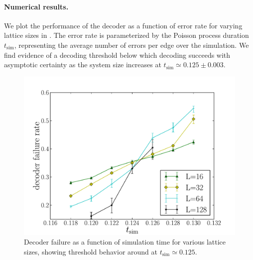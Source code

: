 \documentclass[aps, prl, letterpaper, twocolumn, superscriptaddress, notitlepage, 10pt]{revtex4-1}
\begin{document}
\paragraph{Numerical results.}

	We plot the performance of the decoder as a function of error rate for varying lattice sizes in . The error rate is parameterized by the Poisson process duration $t_{\mathrm{sim}}$, representing the average number of errors per edge over the simulation. We find evidence of a decoding threshold below which decoding succeeds with asymptotic certainty as the system size increases at $t_{\mathrm{sim}}\simeq 0.125 \pm 0.003$.

\begin{figure}[th!]
\begin{center}
	\includegraphics[width=\columnwidth]{anyons-kyle.pdf}
\caption{Decoder failure as a function of simulation time for various lattice sizes, showing threshold behavior around at $t_{\mathrm{sim}}\simeq 0.125$.}
\label{f:threshold}
\end{center}
\end{figure}


	

\end{document}
